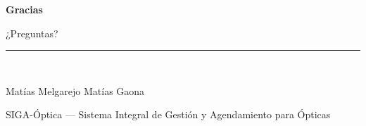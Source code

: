 \documentclass[11pt,aspectratio=169]{beamer}
\begin{document}
{
\begin{frame}[plain]
  \vfill
  \begin{center}
    {\LARGE\bfseries\color{sigaAzul}Gracias\par}
    \vspace{10pt}
    {\large ¿Preguntas?\par}
    \vspace{20pt}
    {\color{sigaAzul!30}\rule{0.35\textwidth}{0.8pt}}\\[12pt]
    {\small Matías Melgarejo \quad\textbullet\quad Matías Gaona\par}
    {\footnotesize\color{sigaGris}SIGA-Óptica --- Sistema Integral de Gestión y Agendamiento para Ópticas\par}
  \end{center}
  \vfill
\end{frame}}
\end{document}
